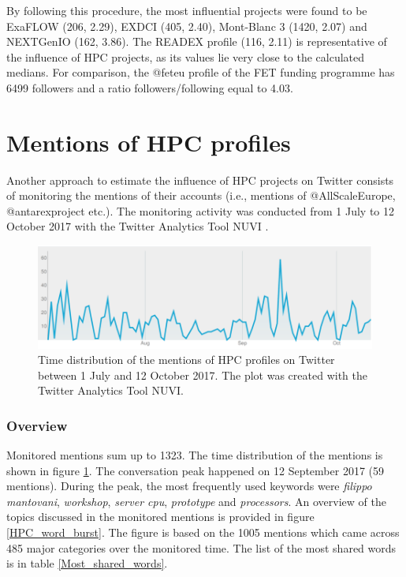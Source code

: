 By following this procedure, the most influential projects were found to be ExaFLOW (206, 2.29), EXDCI (405, 2.40), Mont-Blanc 3 (1420, 2.07) and NEXTGenIO (162, 3.86). The READEX profile (116, 2.11) is representative of the influence of HPC projects, as its values lie very close to the calculated medians. For comparison, the @fet\textunderscore eu profile of the FET funding programme has 6499 followers and a ratio followers/following equal to 4.03.

\section{Mentions of HPC profiles} \label{Mentions_of_HPC_profiles} 
Another approach to estimate the influence of HPC projects on Twitter consists of monitoring the mentions of their accounts (i.e., mentions of @AllScaleEurope, @antarex\textunderscore project etc.). The monitoring activity was conducted from 1 July to 12 October 2017 with the Twitter Analytics Tool NUVI \cite{NUVI}.  

\begin{figure}[!t] 
 \begin{center}
 \includegraphics[scale=0.45]{Images/NUVI_time_distribution.png}
 \caption{Time distribution of the mentions of HPC profiles on Twitter between 1 July and 12 October 2017. The plot was created with the Twitter Analytics Tool NUVI.}
 \label{NUVI_time_distribution}
 \end{center}
\end{figure}

\subsubsection{Overview}
Monitored mentions sum up to 1323. The time distribution of the mentions is shown in figure \ref{NUVI_time_distribution}. The conversation peak happened on 12 September 2017 (59 mentions). During the peak, the most frequently used keywords were \textit{filippo mantovani}, \textit{workshop}, \textit{server cpu}, \textit{prototype} and \textit{processors}. An overview of the topics discussed in the monitored mentions is provided in figure \ref{HPC_word_burst}. The figure is based on the 1005 mentions which came across 485 major categories over the monitored time. The list of the most shared words is in table \ref{Most_shared_words}.

